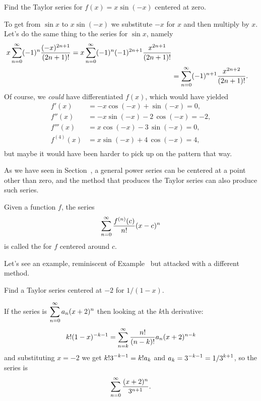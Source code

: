 \begin{example}\label{example:substitute-in-polynomial-to-taylor-series}
  Find the Taylor series for $f(x) = x\sin(-x)$ centered at zero.
\end{example}
\begin{solution}
To get from $\sin x$ to $x\sin(-x)$ we substitute $-x$ for $x$ and
then multiply by $x$.  Let's do the same thing to the series for $\sin
x$, namely
\begin{align*}
  x\sum_{n=0}^\infty (-1)^n{(-x)^{2n+1}\over (2n+1)!} =x\sum_{n=0}^\infty (-1)^{n}(-1)^{2n+1}{x^{2n+1}\over (2n+1)!} \\
  &=\sum_{n=0}^\infty (-1)^{n+1}{x^{2n+2}\over (2n+1)!}.
\end{align*}
Of course, we \textit{could} have differentiated $f(x)$, which would have yielded
\begin{align*}
f'(x) &= -x \cos\left(-x\right) + \sin\left(-x\right) = 0, \\
f''(x) &= -x \sin\left(-x\right) - 2 \, \cos\left(-x\right) = -2, \\
f'''(x) &= x \cos\left(-x\right) - 3 \, \sin\left(-x\right) = 0, \\
f^{(4)}(x) &= x \sin\left(-x\right) + 4 \, \cos\left(-x\right) = 4, \\
\end{align*}
but maybe it would have been harder to pick up on the pattern that way.
\end{solution}

As we have seen in
Section~, a general
power series can be centered at a point other than zero, and the
method that produces the Taylor series can also produce such series.
\begin{definition}\label{defn:taylor-series}
Given a function $f$, the series
$$\sum_{n=0}^\infty {f^{(n)}(c)\over n!}(x-c)^n$$
is called the  for $f$ centered around $c$.
\end{definition}

Let's see an example, reminiscent of
Example~ but
attacked with a different method.
\begin{example}\label{example:taylor-series-centered-at-minus-two}
  Find a Taylor series centered at $-2$ for $1/(1-x)$.
\end{example}

\begin{solution}
If the series is $\displaystyle\sum_{n=0}^\infty a_n(x+2)^n$ then looking at the
$k$th derivative:
$$k!(1-x)^{-k-1}=\sum_{n=k}^\infty {n!\over (n-k)!}a_n(x+2)^{n-k}$$
and substituting $x=-2$ we get
$\displaystyle k!3^{-k-1}=k!a_k$ and $\displaystyle a_k=3^{-k-1}=1/3^{k+1}$, so the series is
$$\sum_{n=0}^\infty {(x+2)^n\over 3^{n+1}}.$$
\end{solution}

